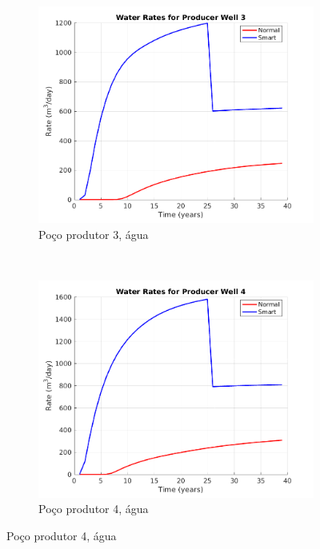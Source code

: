 \begin{figure}[!ht]
	\begin{subfigure}[b]{.45\textwidth}
		\includegraphics[width=\textwidth]{figs/resultadosLSAIGUP/LSAIGUP_WaterWell3_Zoom}
		\caption{Po\c{c}o produtor 3, \'{a}gua}
		\label{LSAIGUP_WaterWell3}
	\end{subfigure}
	~
	\begin{subfigure}[b]{.45\textwidth}
		\includegraphics[width=\textwidth]{figs/resultadosLSAIGUP/LSAIGUP_WaterWell4_Zoom}
		\caption{Po\c{c}o produtor 4, \'{a}gua}
		\label{LSAIGUP_WaterWell4}
	\end{subfigure}
	

\end{figure}
